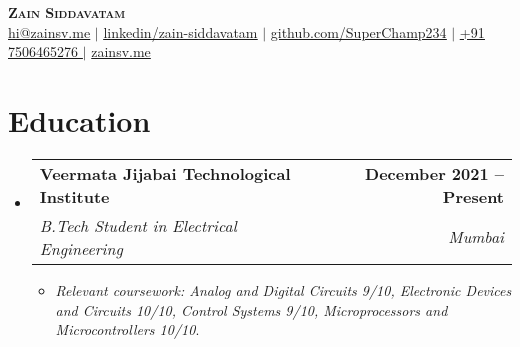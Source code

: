 \documentclass[letterpaper,11pt]{article}
\makeatletter
\newcommand{\resumeItem}[1]{
  \item\small{
    {#1 \vspace{-2pt}}
  }
}
\newcommand{\resumeSubheading}[4]{
  \vspace{-2pt}\item
    \begin{tabular*}{1.0\textwidth}[t]{l@{\extracolsep{\fill}}r}
      \textbf{#1} & \textbf{\small #2} \\
      \textit{\small#3} & \textit{\small #4} \\
    \end{tabular*}\vspace{-7pt}
}
\newcommand{\resumeSubHeadingListStart}{\begin{itemize}[leftmargin=0.0in, label={}]}
\newcommand{\resumeSubHeadingListEnd}{\end{itemize}}
\newcommand{\resumeItemListStart}{\begin{itemize}}
\newcommand{\resumeItemListEnd}{\end{itemize}\vspace{-5pt}}
\makeatother
\begin{document}
\begin{center}
     \textbf{\Huge \scshape Zain Siddavatam} \\ \vspace{1pt}
     \href{mailto:hi@zainsv.me}{\underline{hi@zainsv.me}} $|$ 
    \href{https://www.linkedin.com/in/zain-siddavatam/}{\underline{linkedin/zain-siddavatam}} $|$ 
    \href{https://github.com/SuperChamp234}{\underline{github.com/SuperChamp234}} $|$
    \href{}{\underline{+91 7506465276 }} $|$
    \href{https://zainsv.me}{zainsv.me}
\end{center}


\section{Education}
  \resumeSubHeadingListStart
      \resumeSubheading
      {Veermata Jijabai Technological Institute}{December 2021 -- Present}
      {B.Tech Student in Electrical Engineering}{Mumbai}
      \resumeItemListStart
      \resumeItem{\textit{Relevant coursework: Analog and Digital Circuits 9/10, Electronic Devices and Circuits 10/10, Control Systems 9/10, Microprocessors and Microcontrollers 10/10}.}
      \resumeItemListEnd
  \resumeSubHeadingListEnd

\end{document}
